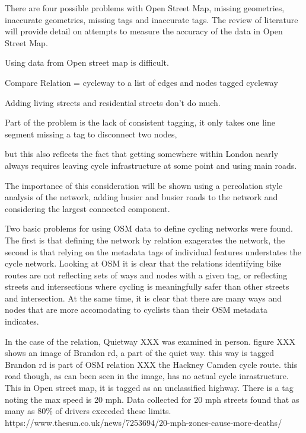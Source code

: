 There are four possible problems with Open Street Map, missing geometries, inaccurate geometries, missing tags and inaccurate tags. The review of literature will provide detail on attempts to measure the accuracy of the data in Open Street Map. 



Using data from Open street map is difficult. 

Compare Relation = cycleway to a list of edges and nodes tagged cycleway

Adding living streets and residential streets don't do much. 

Part of the problem is the lack of consistent tagging, it only takes one line segment missing a tag to disconnect two nodes,

but this also reflects the fact that getting somewhere within London nearly always requires leaving cycle infrastructure at some point and using main roads. 

The importance of this consideration will be shown using a percolation style analysis of the network, adding busier and busier roads to the network and considering the largest connected component. 



Two basic problems for using OSM data to define cycling networks were found. The first is that defining the network by relation exagerates the network, the second is that relying on the metadata tags of individual features understates the cycle network. Looking at OSM it is clear that the relations identifying bike routes are not reflecting sets of ways and nodes with a given tag, or reflecting streets and intersections where cycling is meaningfully safer than other streets and intersection. At the same time, it is clear that there are many ways and nodes that are more accomodating to cyclists than their OSM metadata indicates. 

In the case of the relation, Quietway XXX was examined in person. figure XXX shows an image of Brandon rd, a part of the quiet way. this way is tagged
Brandon rd is part of OSM relation XXX the Hackney Camden cycle route.  this road though, as can been seen in the image, has no actual cycle inrastructure. This in Open street map, it is tagged as an unclassified highway. There is a tag noting the max speed is 20 mph. Data collected for 20 mph streets found that as many as 80\% of drivers exceeded these limits. 
https://www.thesun.co.uk/news/7253694/20-mph-zones-cause-more-deaths/

